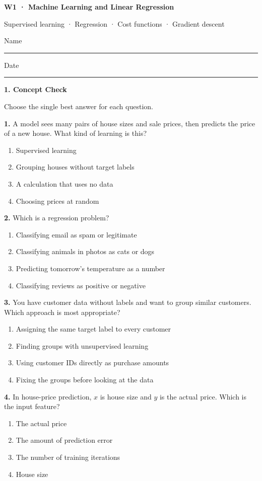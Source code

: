 \documentclass[11pt,a4paper]{article}
\newcommand{\parttitle}[2]{{\large\bfseries\color{ink} #1}\par{\small #2}\par\vspace{5mm}}
\newcommand{\question}[2]{\textbf{#1.} #2\par}
\begin{document}
{\LARGE\bfseries\color{ink} W1 · Machine Learning and Linear Regression}\par
{\small Supervised learning · Regression · Cost functions · Gradient descent}\par
\vspace{3mm}Name\enspace\rule{43mm}{0.3pt}\hfill Date\enspace\rule{35mm}{0.3pt}\par\vspace{3mm}
\parttitle{1. Concept Check}{Choose the single best answer for each question.}
\question{1}{A model sees many pairs of house sizes and sale prices, then predicts the price of a new house. What kind of learning is this?}
\begin{enumerate}[label=(\arabic*),leftmargin=9mm,itemsep=0pt,topsep=2pt,parsep=0pt]
\item Supervised learning
\item Grouping houses without target labels
\item A calculation that uses no data
\item Choosing prices at random
\end{enumerate}\vfill
\question{2}{Which is a regression problem?}
\begin{enumerate}[label=(\arabic*),leftmargin=9mm,itemsep=0pt,topsep=2pt,parsep=0pt]
\item Classifying email as spam or legitimate
\item Classifying animals in photos as cats or dogs
\item Predicting tomorrow's temperature as a number
\item Classifying reviews as positive or negative
\end{enumerate}\vfill
\question{3}{You have customer data without labels and want to group similar customers. Which approach is most appropriate?}
\begin{enumerate}[label=(\arabic*),leftmargin=9mm,itemsep=0pt,topsep=2pt,parsep=0pt]
\item Assigning the same target label to every customer
\item Finding groups with unsupervised learning
\item Using customer IDs directly as purchase amounts
\item Fixing the groups before looking at the data
\end{enumerate}\vfill
\question{4}{In house-price prediction, $x$ is house size and $y$ is the actual price. Which is the input feature?}
\begin{enumerate}[label=(\arabic*),leftmargin=9mm,itemsep=0pt,topsep=2pt,parsep=0pt]
\item The actual price
\item The amount of prediction error
\item The number of training iterations
\item House size
\end{enumerate}\vfill
\end{document}

